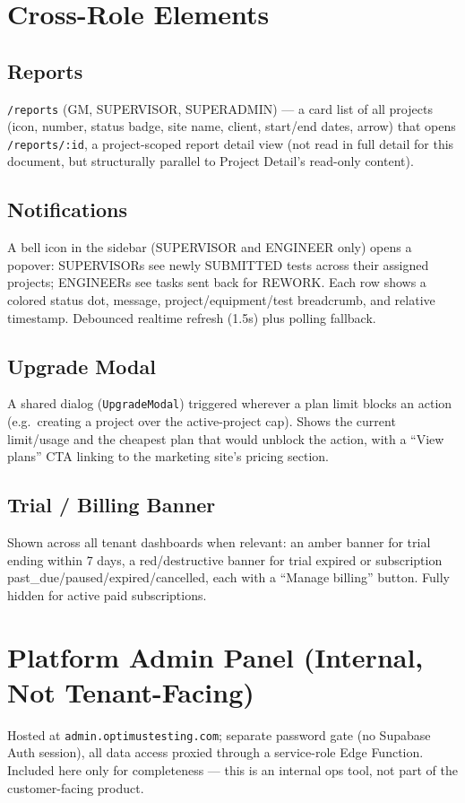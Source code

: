 \documentclass[11pt]{article}
\begin{document}
\section{Cross-Role Elements}

\subsection{Reports}
\texttt{/reports} (GM, SUPERVISOR, SUPERADMIN) --- a card list of all projects (icon, number,
status badge, site name, client, start/end dates, arrow) that opens \texttt{/reports/:id}, a
project-scoped report detail view (not read in full detail for this document, but structurally
parallel to Project Detail's read-only content).

\subsection{Notifications}
A bell icon in the sidebar (SUPERVISOR and ENGINEER only) opens a popover: SUPERVISORs see newly
SUBMITTED tests across their assigned projects; ENGINEERs see tasks sent back for REWORK. Each row
shows a colored status dot, message, project/equipment/test breadcrumb, and relative timestamp.
Debounced realtime refresh (1.5s) plus polling fallback.

\subsection{Upgrade Modal}
\label{sec:upgrade}
A shared dialog (\texttt{UpgradeModal}) triggered wherever a plan limit blocks an action (e.g.\
creating a project over the active-project cap). Shows the current limit/usage and the cheapest
plan that would unblock the action, with a ``View plans'' CTA linking to the marketing site's
pricing section.

\subsection{Trial / Billing Banner}
Shown across all tenant dashboards when relevant: an amber banner for trial ending within 7 days,
a red/destructive banner for trial expired or subscription past\_due/paused/expired/cancelled, each
with a ``Manage billing'' button. Fully hidden for active paid subscriptions.

\section{Platform Admin Panel (Internal, Not Tenant-Facing)}
Hosted at \texttt{admin.optimustesting.com}; separate password gate (no Supabase Auth session), all
data access proxied through a service-role Edge Function. Included here only for completeness ---
this is an internal ops tool, not part of the customer-facing product.
\end{document}
